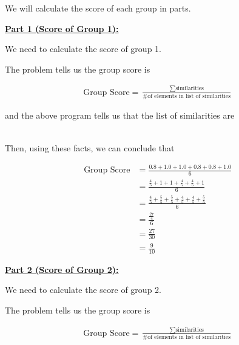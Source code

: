 \documentclass[12pt]{article}
\begin{document}
\begin{mdframed}
\begin{lstlisting}[language=Python]
    \end{lstlisting}

    \bigskip

    \color{red}
    We will calculate the score of each group in parts.

    \bigskip

    \underline{\textbf{Part 1 (Score of Group 1):}}

    \bigskip

    We need to calculate the score of group 1.

    \bigskip

    The problem tells us the group score is

    \begin{align}
        \text{Group Score} = \frac{\sum \text{similarities}}{\text{\# of elements in list of similarities}}
    \end{align}

    \bigskip

    and the above program tells us that the list of similarities are

    \begin{align}
        [0.8, 1.0, 1.0, 0.8, 0.8, 1.0]
    \end{align}

    \bigskip

    Then, using these facts, we can conclude that

    \begin{align}
        \text{Group Score} &= \frac{0.8 + 1.0 + 1.0 + 0.8 + 0.8 + 1.0}{6}\\
        &= \frac{\frac{4}{5} + 1 + 1 + \frac{4}{5} + \frac{4}{5} + 1}{6}\\
        &= \frac{\frac{4}{5} + \frac{5}{5} + \frac{5}{5} + \frac{4}{5} + \frac{4}{5} + \frac{5}{5}}{6}\\
        &= \frac{\frac{27}{4}}{6}\\
        &= \frac{27}{30}\\
        &= \frac{9}{10}
    \end{align}

    \bigskip

    \underline{\textbf{Part 2 (Score of Group 2):}}

    \bigskip

    We need to calculate the score of group 2.

    \bigskip

    The problem tells us the group score is

    \begin{align}
        \text{Group Score} = \frac{\sum \text{similarities}}{\text{\# of elements in list of similarities}}
    \end{align}


\end{mdframed}
\end{document}

